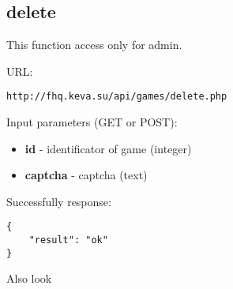 \subsection{delete}
\par

This function access only for admin.

URL:
\begin{Verbatim}[frame=single]
http://fhq.keva.su/api/games/delete.php
\end{Verbatim}

Input parameters (GET or POST):
\begin{itemize}
  \item \textbf{id} - identificator of game (integer)
  \item \textbf{captcha} - captcha (text)
\end{itemize}

Successfully response:  \\
\begin{Verbatim}[frame=single]
{
    "result": "ok"
}
\end{Verbatim}

Also look ~
